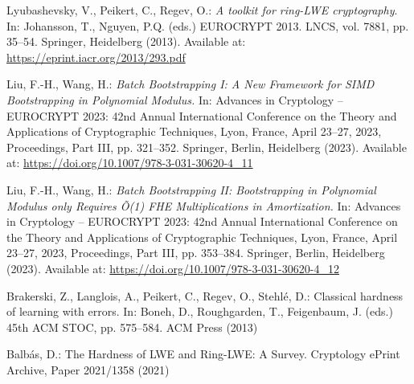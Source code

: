 \documentclass[a4paper,10pt]{article}
\numberwithin{equation}{section} %
\theoremstyle{definition}
\begin{document}
\begin{thebibliography}{9}
    Lyubashevsky, V., Peikert, C., Regev, O.:
    \textit{A toolkit for ring-LWE cryptography}.
    In: Johansson, T., Nguyen, P.Q. (eds.) EUROCRYPT 2013. LNCS, vol. 7881, pp. 35–54. Springer, Heidelberg (2013).
    Available at: \url{https://eprint.iacr.org/2013/293.pdf}
    
    Liu, F.-H., Wang, H.:
    \textit{Batch Bootstrapping I: A New Framework for SIMD Bootstrapping in Polynomial Modulus.} 
    In: Advances in Cryptology -- EUROCRYPT 2023: 42nd Annual International Conference on the Theory and Applications of Cryptographic Techniques, 
    Lyon, France, April 23–27, 2023, Proceedings, Part III, pp. 321–352. 
    Springer, Berlin, Heidelberg (2023). 
    Available at: \url{https://doi.org/10.1007/978-3-031-30620-4_11}
    
    Liu, F.-H., Wang, H.:
    \textit{Batch Bootstrapping II: Bootstrapping in Polynomial Modulus only Requires Õ(1) FHE Multiplications in Amortization.}
    In: Advances in Cryptology -- EUROCRYPT 2023: 42nd Annual International Conference on the Theory and Applications of Cryptographic Techniques, 
    Lyon, France, April 23–27, 2023, Proceedings, Part III, pp. 353–384. 
    Springer, Berlin, Heidelberg (2023). 
    Available at: \url{https://doi.org/10.1007/978-3-031-30620-4_12}
    
    Brakerski, Z., Langlois, A., Peikert, C., Regev, O., Stehlé, D.: Classical hardness of learning with errors. In: Boneh, D., Roughgarden, T., Feigenbaum, J. (eds.) 45th ACM STOC, pp. 575--584. ACM Press (2013)

    Balbás, D.: The Hardness of LWE and Ring-LWE: A Survey. Cryptology ePrint Archive, Paper 2021/1358 (2021)

    \end{thebibliography}
\end{document}
